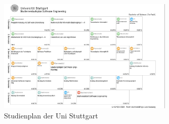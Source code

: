 
\begin{frame}
\begin{figure}
\centering
\includegraphics[width=0.75\textwidth]{studienplan.jpg}
\caption{Studienplan der Uni Stuttgart}
\label{fig:Studienplan}
\end{figure}
\end{frame}
